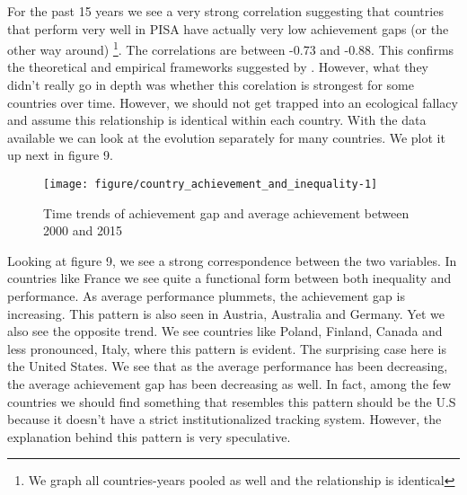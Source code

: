 \documentclass[11pt, a4paper]{article}\usepackage[]{graphicx}\usepackage[]{color}
\begin{document}

For the past 15 years we see a very strong correlation suggesting that countries that perform very well in PISA have actually very low achievement gaps (or the other way around) \footnote{We graph all countries-years pooled as well and the relationship is identical}. The correlations are between -0.73 and -0.88. This confirms the theoretical and empirical frameworks suggested by \citet{werfhorst_mijs}. However, what they didn't really go in depth was whether this corelation is strongest for some countries over time. However, we should not get trapped into an ecological fallacy and assume this relationship is identical within each country. With the data available we can look at the evolution separately for many countries. We plot it up next in figure 9.

\begin{figure}

{\centering \texttt{[image: figure/country\_achievement\_and\_inequality-1]} 

}

\caption[Time trends of achievement gap and average achievement between 2000 and 2015]{Time trends of achievement gap and average achievement between 2000 and 2015}\label{fig:country_achievement_and_inequality}
\end{figure}




Looking at figure 9, we see a strong correspondence between the two variables. In countries like France we see quite a functional form between both inequality and performance. As average performance plummets, the achievement gap is increasing. This pattern is also seen in Austria, Australia and Germany. Yet we also see the opposite trend. We see countries like Poland, Finland, Canada and less pronounced, Italy, where this pattern is evident. The surprising case here is the United States. We see that as the average performance has been decreasing, the average achievement gap has been decreasing as well. In fact, among the few countries we should find something that resembles this pattern should be the U.S because it doesn't have a strict institutionalized tracking system. However, the explanation behind this pattern is very speculative.
\end{document}
